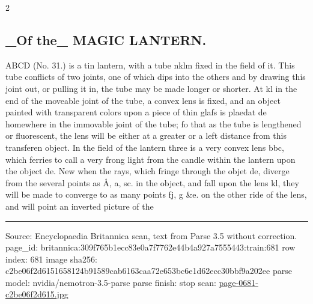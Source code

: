 \documentclass[10pt]{article}
\begin{document}
\begin{multicols}{2}
\subsection*{\_Of the\_ MAGIC LANTERN.}
ABCD (No. 31.) is a tin lantern, with a tube nklm fixed in the field of it. This tube conflicts of two joints, one of which dips into the others and by drawing this joint out, or pulling it in, the tube may be made longer or shorter. At kl in the end of the moveable joint of the tube, a convex lens is fixed, and an object painted with transparent colors upon a piece of thin glafs is plaedat de homewhere in the immovable joint of the tube; fo that as the tube is lengthened or fluorescent, the lens will be either at a greater or a left distance from this transferen object. In the field of the lantern three is a very convex lens bbc, which ferries to call a very frong light from the candle within the lantern upon the object de. New when the rays, which fringe through the objet de, diverge from the several points as Å, a, sc. in the object, and fall upon the lens kl, they will be made to converge to as many points fj, g \&e. on the other ride of the lens, and will point an inverted picture of the

\end{multicols}
\vfill\par\noindent\rule{\linewidth}{0.4pt}\par
{\scriptsize\color{gray}\noindent Source: Encyclopaedia Britannica scan, text from Parse 3.5 without correction. page\_id: britannica:309f765b1ecc83e0a7f7762e44b4a927a7555443:train:681 \quad row index: 681 \quad image sha256: c2be06f2d6151658124b91589cab6163caa72e653bc6e1d62ecc30bbf9a202ee \quad parse model: nvidia/nemotron-3.5-parse \quad parse finish: stop \quad scan: \href{../scans/page-0681-c2be06f2d615.jpg}{page-0681-c2be06f2d615.jpg}\par}
\end{document}

